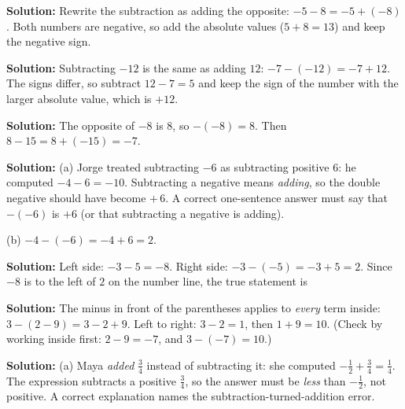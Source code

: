 \documentclass[12pt]{article}
\begin{document}



\textbf{Solution:} Rewrite the subtraction as adding the opposite: $-5 - 8 = -5 + (-8)$.
Both numbers are negative, so add the absolute values ($5 + 8 = 13$) and keep the
negative sign. 


\textbf{Solution:} Subtracting $-12$ is the same as adding $12$:
$-7 - (-12) = -7 + 12$. The signs differ, so subtract $12 - 7 = 5$ and keep the sign
of the number with the larger absolute value, which is $+12$. 


\textbf{Solution:} The opposite of $-8$ is $8$, so $-(-8) = 8$. Then
$8 - 15 = 8 + (-15) = -7$. 


\textbf{Solution:} (a) Jorge treated subtracting $-6$ as subtracting positive $6$: he
computed $-4 - 6 = -10$. Subtracting a negative means \emph{adding}, so the double
negative should have become $+\,6$. A correct one-sentence answer must say that
$-(-6)$ is $+6$ (or that subtracting a negative is adding).

(b) $-4 - (-6) = -4 + 6 = 2$. 


\textbf{Solution:} Left side: $-3 - 5 = -8$. Right side: $-3 - (-5) = -3 + 5 = 2$.
Since $-8$ is to the left of $2$ on the number line, the true statement
is 


\textbf{Solution:} The minus in front of the parentheses applies to \emph{every} term
inside: $3 - (2 - 9) = 3 - 2 + 9$. Left to right: $3 - 2 = 1$, then $1 + 9 = 10$.
(Check by working inside first: $2 - 9 = -7$, and $3 - (-7) = 10$.) 


\textbf{Solution:} (a) Maya \emph{added} $\tfrac{3}{4}$ instead of subtracting it: she
computed $-\tfrac{1}{2} + \tfrac{3}{4} = \tfrac{1}{4}$. The expression subtracts a
positive $\tfrac{3}{4}$, so the answer must be \emph{less} than $-\tfrac{1}{2}$, not
positive. A correct explanation names the subtraction-turned-addition error.
\end{document}
